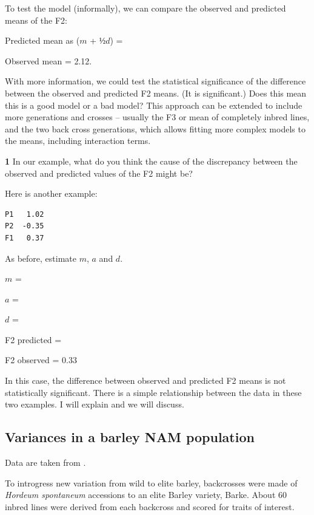 \documentclass[
]{book}
\makeatletter
\newenvironment{kframe}{%
\medskip{}
\setlength{\fboxsep}{.8em}
 \def\at@end@of@kframe{}%
 \ifinner\ifhmode%
  \def\at@end@of@kframe{\end{minipage}}%
  \begin{minipage}{\columnwidth}%
 \fi\fi%
 \def\FrameCommand##1{\hskip\@totalleftmargin \hskip-\fboxsep
 \colorbox{shadecolor}{##1}\hskip-\fboxsep
     \hskip-\linewidth \hskip-\@totalleftmargin \hskip\columnwidth}%
 \MakeFramed {\advance\hsize-\width
   \@totalleftmargin\z@ \linewidth\hsize
   \@setminipage}}%
 {\par\unskip\endMakeFramed%
 \at@end@of@kframe}
\newenvironment{rmdblock}[1]
  {
  \begin{itemize}
  \renewcommand{\labelitemi}{
    \raisebox{-.7\height}[0pt][0pt]{
      {\setkeys{Gin}{width=3em,keepaspectratio}\texttt{[image: images/\#1]}}
    }
  }
  \setlength{\fboxsep}{1em}
  \begin{kframe}
  \item
  }
  {
  \end{kframe}
  \end{itemize}
  }
\newenvironment{rmdquiz}
  {\begin{rmdblock}{quiz}}
  {\end{rmdblock}}
\makeatother
\begin{document}
To test the model (informally), we can compare the observed and predicted means of the F2:

Predicted mean as (\(m\) + \(½d\)) =

Observed mean = 2.12.

With more information, we could test the statistical significance of the difference between the observed and predicted F2 means. (It is significant.) Does this mean this is a good model or a bad model? This approach can be extended to include more generations and crosses -- usually the F3 or mean of completely inbred lines, and the two back cross generations, which allows fitting more complex models to the means, including interaction terms.

\begin{rmdquiz}
\textbf{1}
In our example, what do you think the cause of the discrepancy between the observed and predicted values of the F2 might be?
\end{rmdquiz}

Here is another example:

\begin{verbatim}
P1   1.02
P2  -0.35
F1   0.37
\end{verbatim}

As before, estimate \(m\), \(a\) and \(d\).

\(m\) =

\(a\) =

\(d\) =

F2 predicted =

F2 observed = 0.33

In this case, the difference between observed and predicted F2 means is not statistically significant. There is a simple relationship between the data in these two examples. I will explain and we will discuss.

\hypertarget{variances-in-a-barley-nam-population}{%
\subsection{Variances in a barley NAM population}\label{variances-in-a-barley-nam-population}}

Data are taken from \citet{Sharma2018}.

To introgress new variation from wild to elite barley, backcrosses were made of \emph{Hordeum spontaneum} accessions to an elite Barley variety, Barke. About 60 inbred lines were derived from each backcross and scored for traits of interest.
\end{document}
